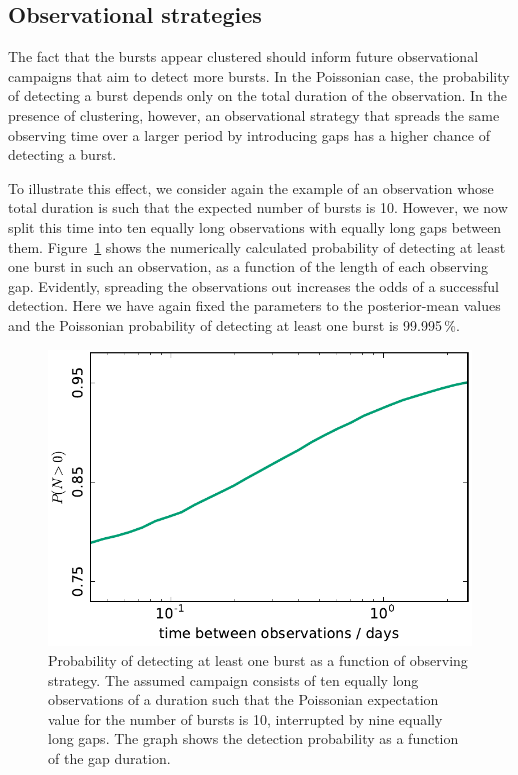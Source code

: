 \documentclass[fleqn,usenatbib]{mnras}
\newcommand{\new}[1]{#1}
\begin{document}
\subsection{Observational strategies}
\label{sec:obs_strategies}

The fact that the bursts appear clustered should inform future observational campaigns that aim to detect more bursts. In the Poissonian case, the probability of detecting a burst depends only on the total duration of the observation. In the presence of clustering, however, an observational strategy that spreads the same observing time over a larger period by introducing gaps has a higher chance of detecting a burst.

To illustrate this effect, we consider \new{again the example of an observation whose total duration is such that the expected number of bursts is 10. However, we now split this time into ten equally long observations with equally long gaps between them.} Figure~\ref{fig:obs_strategy} shows the numerically calculated probability of detecting at least one burst in such an observation, as a function of the length of each observing gap. Evidently, spreading the observations out increases the odds of a successful detection. Here we have again fixed the parameters to the posterior-mean values \new{and the Poissonian probability of detecting at least one burst is 99.995\,\%.}

\begin{figure}
	\includegraphics[width=1.0\columnwidth]{obs_strategy.pdf}
	\caption{\label{fig:obs_strategy}Probability of detecting at least one burst as a function of observing strategy. The assumed campaign consists of ten \new{equally long} observations of \new{a duration such that the Poissonian expectation value for the number of bursts is 10}, interrupted by nine equally long gaps. The graph shows the detection probability as a function of the gap duration.}
\end{figure}
\end{document}
